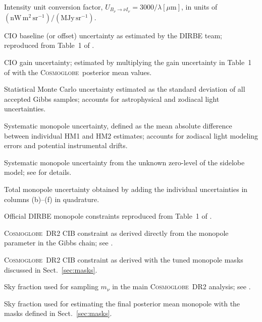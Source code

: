 \documentclass{aa}
\newcommand{\cosmoglobe}{\textsc{Cosmoglobe}}
\begin{document}
\begin{table}
{{%
\noalign{\vskip 5pt\hrule\vskip 5pt}}}
\endPlancktablewide
{} Intensity unit conversion factor, $U_{B_\nu\rightarrow\nu I_\nu} = 3000/\lambda[\mu\mathrm{m}]$, in units of $(\mathrm{nW}\,\mathrm{m}^2\,\mathrm{sr}^{-1}) / (\mathrm{MJy}\,\mathrm{sr}^{-1})$.\par
{} CIO baseline (or offset) uncertainty as estimated by the DIRBE team; reproduced from Table~1 of \citet{hauser1998}.\par
{} CIO gain uncertainty; estimated by multiplying
the gain uncertainty in Table~1 of \citet{hauser1998} with the
\cosmoglobe\ posterior mean values.\par
{} Statistical Monte Carlo uncertainty estimated as the standard deviation of all accepted Gibbs samples; accounts for astrophysical and zodiacal light uncertainties.\par
{} Systematic monopole uncertainty, defined as the mean absolute difference between individual HM1 and HM2 estimates; accounts for zodiacal light modeling errors and potential instrumental drifts.\par
{} Systematic monopole uncertainty from the unknown zero-level of the sidelobe model; see \citet{CG02_01} for details.\par
{} Total monopole uncertainty obtained by adding the individual uncertainties in columns (b)--(f) in quadrature.\par
{} Official DIRBE monopole constraints reproduced from Table~1 of \citet{hauser1998}.\par
{} \cosmoglobe\ DR2 CIB constraint as derived directly from the monopole parameter in the Gibbs chain; see \citet{CG02_01}.\par
{} \cosmoglobe\ DR2 CIB constraint as derived with the tuned monopole masks discussed in Sect.~\ref{sec:masks}.\par
{} Sky fraction used for sampling $m_{\nu}$ in the main \cosmoglobe\ DR2 analysis; see \citet{CG02_01}.\par
{} Sky fraction used for estimating the final posterior mean monopole with the masks defined in Sect.~\ref{sec:masks}.\par
\par
\end{table}
\end{document}
